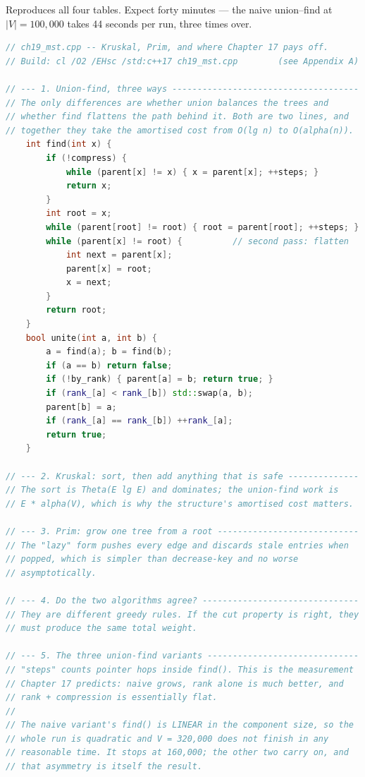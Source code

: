 \begin{lab}
Reproduces all four tables. Expect forty minutes --- the naive union--find at
$|V| = 100{,}000$ takes 44 seconds per run, three times over.

\begin{lstlisting}[language=C++]
// ch19_mst.cpp -- Kruskal, Prim, and where Chapter 17 pays off.
// Build: cl /O2 /EHsc /std:c++17 ch19_mst.cpp        (see Appendix A)

// --- 1. Union-find, three ways -------------------------------------
// The only differences are whether union balances the trees and
// whether find flattens the path behind it. Both are two lines, and
// together they take the amortised cost from O(lg n) to O(alpha(n)).
    int find(int x) {
        if (!compress) {
            while (parent[x] != x) { x = parent[x]; ++steps; }
            return x;
        }
        int root = x;
        while (parent[root] != root) { root = parent[root]; ++steps; }
        while (parent[x] != root) {          // second pass: flatten
            int next = parent[x];
            parent[x] = root;
            x = next;
        }
        return root;
    }
    bool unite(int a, int b) {
        a = find(a); b = find(b);
        if (a == b) return false;
        if (!by_rank) { parent[a] = b; return true; }
        if (rank_[a] < rank_[b]) std::swap(a, b);
        parent[b] = a;
        if (rank_[a] == rank_[b]) ++rank_[a];
        return true;
    }

// --- 2. Kruskal: sort, then add anything that is safe --------------
// The sort is Theta(E lg E) and dominates; the union-find work is
// E * alpha(V), which is why the structure's amortised cost matters.

// --- 3. Prim: grow one tree from a root ----------------------------
// The "lazy" form pushes every edge and discards stale entries when
// popped, which is simpler than decrease-key and no worse
// asymptotically.

// --- 4. Do the two algorithms agree? -------------------------------
// They are different greedy rules. If the cut property is right, they
// must produce the same total weight.

// --- 5. The three union-find variants ------------------------------
// "steps" counts pointer hops inside find(). This is the measurement
// Chapter 17 predicts: naive grows, rank alone is much better, and
// rank + compression is essentially flat.
//
// The naive variant's find() is LINEAR in the component size, so the
// whole run is quadratic and V = 320,000 does not finish in any
// reasonable time. It stops at 160,000; the other two carry on, and
// that asymmetry is itself the result.


\end{lstlisting}
\end{lab}
